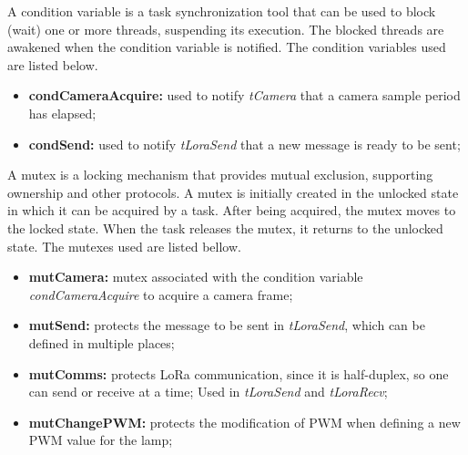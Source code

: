 
A condition variable is a task synchronization tool that can be used to block (wait) one or more threads, suspending its execution. The blocked threads are awakened when the condition variable is notified. The condition variables used are listed below.

\begin{itemize}
	\item \textbf{condCameraAcquire:} used to notify \textit{tCamera} that a camera sample period has elapsed;
	
	
	\item \textbf{condSend:} used to notify \textit{tLoraSend} that a new message is ready to be sent;
	
	
\end{itemize}


A mutex is a locking mechanism that provides mutual exclusion, supporting ownership and other protocols. A mutex is initially created in the unlocked state in which it can be acquired by a task. After being acquired, the mutex moves to the locked state. When the task releases the mutex, it returns to the unlocked state. The mutexes used are listed bellow.

\begin{itemize}
	\item \textbf{mutCamera:} mutex associated with the condition variable \textit{condCameraAcquire} to acquire a camera frame;
		
	\item \textbf{mutSend:} protects the message to be sent in \textit{tLoraSend}, which can be defined in multiple places;
	
	\item \textbf{mutComms:} protects LoRa communication, since it is half-duplex, so one can send or receive at a time; Used in \textit{tLoraSend} and \textit{tLoraRecv};
	
	\item \textbf{mutChangePWM:} protects the modification of PWM when defining a new PWM value for the lamp;
	
	
\end{itemize}


